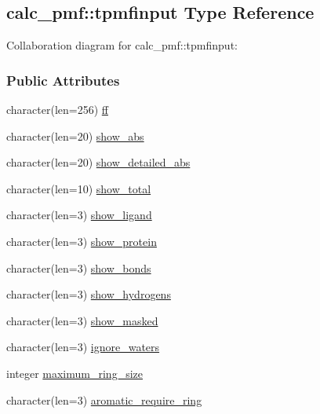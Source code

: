 \hypertarget{structcalc__pmf_1_1tpmfinput}{\subsection{calc\-\_\-pmf\-:\-:tpmfinput Type Reference}
\label{structcalc__pmf_1_1tpmfinput}
}


Collaboration diagram for calc\-\_\-pmf\-:\-:tpmfinput\-:
\subsubsection*{Public Attributes}
\begin{DoxyCompactItemize}
\item 
character(len=256) \hyperlink{structcalc__pmf_1_1tpmfinput_abcff6d17f6b26bfdb54cadeb55a7abe5}{ff}
\item 
character(len=20) \hyperlink{structcalc__pmf_1_1tpmfinput_abea97c28c457a9014db464ac2c82e9bd}{show\-\_\-abs}
\item 
character(len=20) \hyperlink{structcalc__pmf_1_1tpmfinput_abdfb3edfb37176ea484f3b5210442261}{show\-\_\-detailed\-\_\-abs}
\item 
character(len=10) \hyperlink{structcalc__pmf_1_1tpmfinput_a52344e226e3919a5839c574a7b66f02f}{show\-\_\-total}
\item 
character(len=3) \hyperlink{structcalc__pmf_1_1tpmfinput_a8afeb6f4281fa01218b99de652f3c80f}{show\-\_\-ligand}
\item 
character(len=3) \hyperlink{structcalc__pmf_1_1tpmfinput_a9d0b01364dd15c970dcd35380a634e36}{show\-\_\-protein}
\item 
character(len=3) \hyperlink{structcalc__pmf_1_1tpmfinput_ab06e8adc83f49d2e29b12635267d05fc}{show\-\_\-bonds}
\item 
character(len=3) \hyperlink{structcalc__pmf_1_1tpmfinput_ae5dd952594b8fc620f792a47474bf724}{show\-\_\-hydrogens}
\item 
character(len=3) \hyperlink{structcalc__pmf_1_1tpmfinput_a4aa3b6001cae5d27f9969f2b481572c5}{show\-\_\-masked}
\item 
character(len=3) \hyperlink{structcalc__pmf_1_1tpmfinput_a93111194c92ec05302177ba26e3bdbc6}{ignore\-\_\-waters}
\item 
integer \hyperlink{structcalc__pmf_1_1tpmfinput_ab2687fd07fe27d6e6f38ca8166a911ea}{maximum\-\_\-ring\-\_\-size}
\item 
character(len=3) \hyperlink{structcalc__pmf_1_1tpmfinput_af0a260f10ecb417b06c204a6c6197af9}{aromatic\-\_\-require\-\_\-ring}

\end{DoxyCompactItemize}
